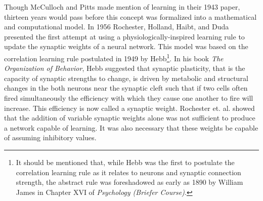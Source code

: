 \documentclass[11pt]{afthesis}
\begin{document}
	Though McCulloch and Pitts made mention of learning in their 1943 paper, thirteen years would pass before this concept was formalized into a mathematical and computational model. In 1956 Rochester, Holland, Haibt, and Duda \cite{rochester1956} presented the first attempt at using a physiologically-inspired learning rule to update the synaptic weights of a neural network. This model was based on the correlation learning rule postulated in 1949 by Hebb\footnote{It should be mentioned that, while Hebb was the first to postulate the correlation learning rule as it relates to neurons and synaptic connection strength, the abstract rule was foreshadowed as early as 1890 by William James \cite{james1890principles} in Chapter XVI of \textit{Psychology (Briefer Course)}.}. In his book \textit{The Organization of Behavior}, Hebb suggested that synaptic plasticity, that is the capacity of synaptic strengths to change, is driven by metabolic and structural changes in the both neurons near the synaptic cleft \cite{hebb1967} such that if two cells often fired simultaneously the efficiency with which they cause one another to fire will increase. This efficiency is now called a synaptic weight. Rochester et. al. showed that the addition of variable synaptic weights alone was not sufficient to produce a network capable of learning. It was also necessary that these weights be capable of assuming inhibitory values.
	
\end{document}
